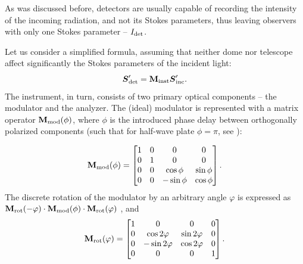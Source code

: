 As was discussed before, detectors are usually capable of recording the intensity of the incoming radiation, and not its Stokes parameters, thus leaving observers with only one Stokes parameter -- $I_{\mathrm{det}}$.

Let us consider a simplified formula, assuming that neither dome nor telescope affect significantly the Stokes parameters of the incident light:
\begin{equation}
    \label{eq:dipol-uf:data_proc:gen_form}
    \boldsymbol{S}_{\mathrm{det}}^\prime =  \mathbf{M}_{\mathrm{inst}} \boldsymbol{S}_{\mathrm{inc}}^\prime.
\end{equation}
The instrument, in turn, consists of two primary optical components -- the modulator and the analyzer.
The (ideal) modulator is represented with a matrix operator $\mathbf{M}_{\mathrm{mod}}(\phi)$, where $\phi$ is the introduced phase delay between orthogonally polarized components (such that for half-wave plate $\phi = \pi$, see \citealt{PolarizedLight2}):

\begin{equation}
    \mathbf{M}_{\mathrm{mod}}(\phi) =
    \begin{bmatrix}
    1 & 0 & 0 & 0 \\
    0 & 1 & 0 & 0 \\
    0 & 0 & \cos\phi & \sin\phi \\
    0 & 0 & -\sin\phi & \cos\phi \\    
    \end{bmatrix}.
\end{equation}
The discrete rotation of the modulator by an arbitrary angle $\varphi$ is expressed as $\mathbf{M}_{\mathrm{rot}}(-\varphi) \cdot \mathbf{M}_{\mathrm{mod}}(\phi) \cdot \mathbf{M}_{\mathrm{rot}}(\varphi)$ \citep{PolarizedLight2}, and
\begin{equation}
    \mathbf{M}_{\mathrm{rot}}(\varphi) =
    \begin{bmatrix}
    1 & 0 & 0 & 0 \\
    0 & \cos2\varphi & \sin2\varphi & 0 \\
    0 & -\sin2\varphi & \cos2\varphi & 0 \\
    0 & 0 & 0 & 1
    \end{bmatrix}.
\end{equation}

